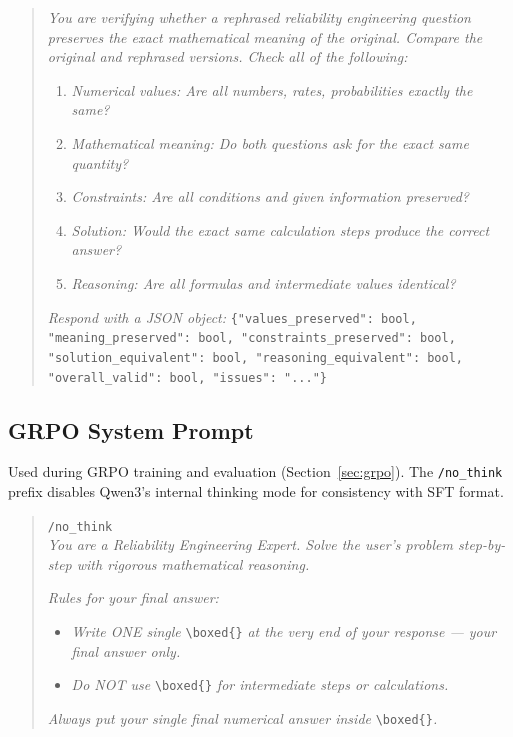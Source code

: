 \begin{quote}
\small
\textit{You are verifying whether a rephrased reliability engineering question preserves the exact mathematical meaning of the original. Compare the original and rephrased versions. Check all of the following:}
\begin{enumerate}\small
    \item \textit{Numerical values: Are all numbers, rates, probabilities exactly the same?}
    \item \textit{Mathematical meaning: Do both questions ask for the exact same quantity?}
    \item \textit{Constraints: Are all conditions and given information preserved?}
    \item \textit{Solution: Would the exact same calculation steps produce the correct answer?}
    \item \textit{Reasoning: Are all formulas and intermediate values identical?}
\end{enumerate}

\textit{Respond with a JSON object:}
\texttt{\{"values\_preserved": bool, "meaning\_preserved": bool, "constraints\_preserved": bool, "solution\_equivalent": bool, "reasoning\_equivalent": bool, "overall\_valid": bool, "issues": "..."\}}
\end{quote}

\subsection{GRPO System Prompt}
\label{app:prompt:grpo}

Used during GRPO training and evaluation (Section~\ref{sec:grpo}). The \texttt{/no\_think} prefix disables Qwen3's internal thinking mode for consistency with SFT format.

\begin{quote}
\small
\texttt{/no\_think}\\
\textit{You are a Reliability Engineering Expert. Solve the user's problem step-by-step with rigorous mathematical reasoning.}

\textit{Rules for your final answer:}
\begin{itemize}\small
    \item \textit{Write ONE single} \verb|\boxed{}| \textit{at the very end of your response --- your final answer only.}
    \item \textit{Do NOT use} \verb|\boxed{}| \textit{for intermediate steps or calculations.}
\end{itemize}
\textit{Always put your single final numerical answer inside} \verb|\boxed{}|\textit{.}
\end{quote}

